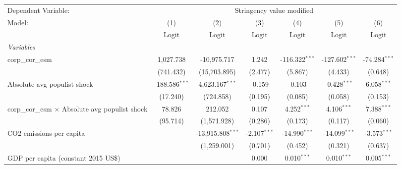 
\begingroup
\centering
\begin{tabular}{lcccccc}
   \toprule
   Dependent Variable: & \multicolumn{6}{c}{Stringency value modified}\\
   Model:                                                 & (1)              & (2)                 & (3)            & (4)              & (5)              & (6)\\  
                                                          &  Logit           & Logit               & Logit          & Logit            & Logit            & Logit\\  
   \midrule
   \emph{Variables}\\
   corp\_cor\_esm                                         & 1,027.738        & -10,975.717         & 1.242          & -116.322$^{***}$ & -127.602$^{***}$ & -74.284$^{***}$\\   
                                                          & (741.432)        & (15,703.895)        & (2.477)        & (5.867)          & (4.433)          & (0.648)\\   
   Absolute avg populist shock                            & -188.586$^{***}$ & 4,623.167$^{***}$   & -0.159         & -0.103           & -0.428$^{***}$   & 6.058$^{***}$\\   
                                                          & (17.240)         & (724.858)           & (0.195)        & (0.085)          & (0.058)          & (0.153)\\   
   corp\_cor\_esm $\times$ Absolute avg populist shock    & 78.826           & 212.052             & 0.107          & 4.252$^{***}$    & 4.106$^{***}$    & 7.388$^{***}$\\   
                                                          & (95.714)         & (1,571.928)         & (0.286)        & (0.173)          & (0.117)          & (0.060)\\   
   CO2 emissions per capita                               &                  & -13,915.808$^{***}$ & -2.107$^{***}$ & -14.990$^{***}$  & -14.099$^{***}$  & -3.573$^{***}$\\   
                                                          &                  & (1,259.001)         & (0.701)        & (0.452)          & (0.321)          & (0.637)\\   
   GDP per capita (constant 2015 US\$)                    &                  &                     & 0.000          & 0.010$^{***}$    & 0.010$^{***}$    & 0.005$^{***}$\\   

\end{tabular}
